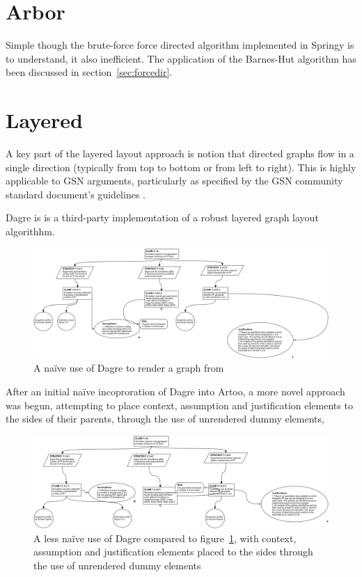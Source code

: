 \section{Arbor}

Simple though the brute-force force directed algorithm implemented in Springy is to understand, it also inefficient. The application of the Barnes-Hut algorithm has been discussed in section~\ref{sec:forcedir}.


\section{Layered}

A key part of the layered layout approach is notion that directed graphs flow in a single direction (typically from top to bottom or from left to right). This is highly applicable to GSN arguments, particularly as specified by the GSN community standard document's guidelines \cite{gsnstandard}.

Dagre is is a third-party implementation of a robust layered graph layout algorithhm.

\begin{figure}
  \centering
  \includegraphics[width=\textwidth]{graphics/results/a4-dagre.png}
  \caption{A na\"ive use of Dagre to render a graph from \cite{aldenthesis}}
  \label{fig:dagre1}
\end{figure}

After an initial na\"ive incoproration of Dagre into Artoo, a more novel approach was begun, attempting to place context, assumption and justification elements to the sides of their parents, through the use of unrendered dummy elements,

\begin{figure}
  \centering
  \includegraphics[width=\textwidth]{graphics/results/a4-dagre-novel.png}
  \caption{A less na\"ive use of Dagre compared to figure~\ref{fig:dagre1}, with context, assumption and justification elements placed to the sides through the use of unrendered dummy elements}
  \label{fig:dagre2}
\end{figure}


